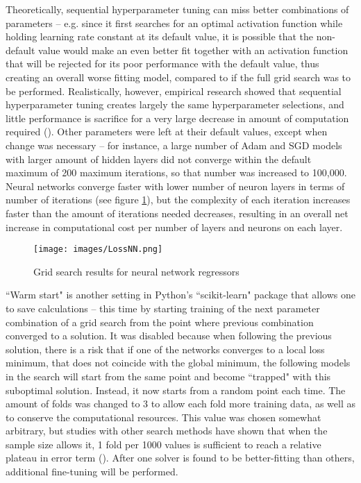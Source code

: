 \documentclass[12pt]{report}
\begin{document}
Theoretically, sequential hyperparameter tuning can miss better combinations of parameters -- e.g. since it first searches for an optimal activation function while holding learning rate constant at its default value, it is possible that the non-default value would make an even better fit together with an activation function that will be rejected for its poor performance with the default value, thus creating an overall worse fitting model, compared to if the full grid search was to be performed. Realistically, however, empirical research showed that sequential hyperparameter tuning creates largely the same hyperparameter selections, and little performance is sacrifice for a very large decrease in amount of computation required (\cite{jin2022}). Other parameters were left at their default values, except when change was necessary -- for instance, a large number of Adam and SGD models with larger amount of hidden layers did not converge within the default maximum of 200 maximum iterations, so that number was increased to 100,000. Neural networks converge faster with lower number of neuron layers in terms of number of iterations (see figure \ref{fig:nnloss}), but the complexity of each iteration increases faster than the amount of iterations needed decreases, resulting in an overall net increase in computational cost per number of layers and neurons on each layer.

\begin{figure}[h]
	\centering
	\texttt{[image: images/LossNN.png]}
	\caption{Grid search results for neural network regressors}
	\label{fig:nnloss}
\end{figure}

``Warm start" is another setting in Python's ``scikit-learn" package that allows one to save calculations -- this time by starting training of the next parameter combination of a grid search from the point where previous combination converged to a solution. It was disabled because when following the previous solution, there is a risk that if one of the networks converges to a local loss minimum, that does not coincide with the global minimum, the following models in the search will start from the same point and become ``trapped" with this suboptimal solution. Instead, it now starts from a random point each time. The amount of folds was changed to 3 to allow each fold more training data, as well as to conserve the computational resources. This value was chosen somewhat arbitrary, but studies with other search methods have shown that when the sample size allows it, 1 fold per 1000 values is sufficient to reach a relative plateau in error term (\cite{marcot2021}). After one solver is found to be better-fitting than others, additional fine-tuning will be performed.
\end{document}

